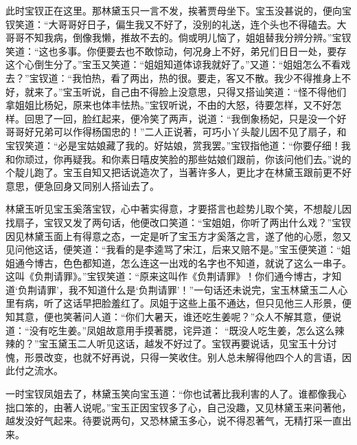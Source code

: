 \begin{parag}


    此时宝钗正在这里。那林黛玉只一言不发，挨著贾母坐下。宝玉没甚说的，便向宝钗笑道：“大哥哥好日子，偏生我又不好了，没别的礼送，连个头也不得磕去。大哥哥不知我病，倒像我懒，推故不去的。倘或明儿恼了，姐姐替我分辨分辨。”宝钗笑道：“这也多事。你便要去也不敢惊动，何况身上不好，弟兄们日日一处，要存这个心倒生分了。”宝玉又笑道：“姐姐知道体谅我就好了。”又道：“姐姐怎么不看戏去？”宝钗道：“我怕热，看了两出，热的很。要走，客又不散。我少不得推身上不好，就来了。”宝玉听说，自己由不得脸上没意思，只得又搭讪笑道：“怪不得他们拿姐姐比杨妃，原来也体丰怯热。”宝钗听说，不由的大怒，待要怎样，又不好怎样。回思了一回，脸红起来，便冷笑了两声，说道：“我倒象杨妃，只是没一个好哥哥好兄弟可以作得杨国忠的！”二人正说著，可巧小丫头靛儿因不见了扇子，和宝钗笑道：“必是宝姑娘藏了我的。好姑娘，赏我罢。”宝钗指他道：“你要仔细！我和你顽过，你再疑我。和你素日嘻皮笑脸的那些姑娘们跟前，你该问他们去。”说的个靛儿跑了。宝玉自知又把话说造次了，当著许多人，更比才在林黛玉跟前更不好意思，便急回身又同别人搭讪去了。
\end{parag}


\begin{parag}


    林黛玉听见宝玉奚落宝钗，心中著实得意，才要搭言也趁势儿取个笑，不想靛儿因找扇子，宝钗又发了两句话，他便改口笑道：“宝姐姐，你听了两出什么戏？”宝钗因见林黛玉面上有得意之态，一定是听了宝玉方才奚落之言，遂了他的心愿，忽又见问他这话，便笑道：“我看的是李逵骂了宋江，后来又赔不是。”宝玉便笑道：“姐姐通今博古，色色都知道，怎么连这一出戏的名字也不知道，就说了这么一串子。这叫《负荆请罪》。”宝钗笑道：“原来这叫作《负荆请罪》！你们通今博古，才知道‘负荆请罪’，我不知道什么是‘负荆请罪’！”一句话还未说完，宝玉林黛玉二人心里有病，听了这话早把脸羞红了。凤姐于这些上虽不通达，但只见他三人形景，便知其意，便也笑著问人道：“你们大暑天，谁还吃生姜呢？”众人不解其意，便说道：“没有吃生姜。”凤姐故意用手摸著腮，诧异道： “既没人吃生姜，怎么这么辣辣的？”宝玉黛玉二人听见这话，越发不好过了。宝钗再要说话，见宝玉十分讨愧，形景改变，也就不好再说，只得一笑收住。别人总未解得他四个人的言语，因此付之流水。
\end{parag}


\begin{parag}


    一时宝钗凤姐去了，林黛玉笑向宝玉道：“你也试著比我利害的人了。谁都像我心拙口笨的，由著人说呢。”宝玉正因宝钗多了心，自己没趣，又见林黛玉来问著他，越发没好气起来。待要说两句，又恐林黛玉多心，说不得忍著气，无精打采一直出来。
\end{parag}


